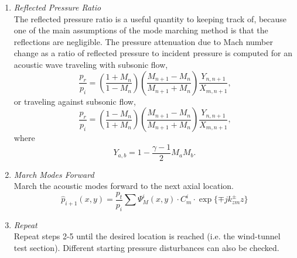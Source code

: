 \begin{enumerate}
  \item \textit{Reflected Pressure Ratio} \\
  The reflected pressure ratio is a useful quantity to keeping track of, because one of the main assumptions of the mode marching method is that the reflections are negligible.
  The pressure attenuation due to Mach number change \cite{Powell-1959-W7KVArvn} as a ratio of reflected pressure to incident pressure is computed for an acoustic wave traveling with subsonic flow,
  \begin{equation}
    \frac{p_r}{p_i} = \left(\frac{1+M_n}{1-M_n}\right)\left(\frac{M_{n+1}-M_n}{M_{n+1}+M_n}\right)\frac{Y_{n,n+1}}{X_{m,n+1}} \textrm{,}
    \label{eqn:03_pressure_ratio_with_reflected}
  \end{equation}
  or traveling against subsonic flow,
  \begin{equation}
    \frac{p_r}{p_i} = \left(\frac{1-M_n}{1+M_n}\right)\left(\frac{M_{n+1}-M_n}{M_{n+1}+M_n}\right)\frac{Y_{n,n+1}}{X_{m,n+1}} \textrm{,}
    \label{eqn:03_pressure_ratio_against_reflected}
  \end{equation}
  where
\begin{equation}
  Y_{a,b} = 1-\frac{\gamma-1}{2}M_aM_b \textrm{.}
\end{equation}

  \item \textit{March Modes Forward} \\
  March the acoustic modes forward to the next axial location.
  \begin{equation}
    \hat{p}_{i+1}(x,y) = \frac{p_t}{p_i}\sum\Psi_M^i(x,y)\cdot C_m^i\cdot\exp\{\mp j k_{zm}^\pm z\}
  \end{equation}

  \item \textit{Repeat} \\
  Repeat steps 2-5 until the desired location is reached (i.e. the wind-tunnel test section).
  Different starting pressure disturbances can also be checked.
\end{enumerate}

